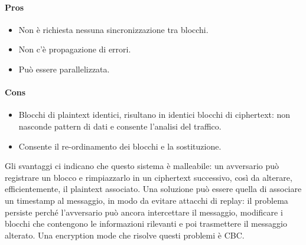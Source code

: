 \documentclass[a4paper,12pt]{article}
\begin{document}
\paragraph{Pros}
\begin{itemize}
	\item Non è richiesta nessuna sincronizzazione tra blocchi.
	\item Non c'è propagazione di errori.
	\item Può essere parallelizzata.
\end{itemize}
\paragraph{Cons}
\begin{itemize}
	\item Blocchi di plaintext identici, risultano in identici blocchi di ciphertext: non nasconde pattern di dati e consente l'analisi del traffico.
	\item Consente il re-ordinamento dei blocchi e la sostituzione.
\end{itemize}
Gli svantaggi ci indicano che questo sistema è malleabile: un avversario può registrare un blocco e rimpiazzarlo in un ciphertext successivo, così da alterare, efficientemente, il plaintext associato.
Una soluzione può essere quella di associare un timestamp al messaggio, in modo da evitare attacchi di replay: il problema persiste perché l'avversario può ancora intercettare il messaggio, modificare i blocchi che contengono le informazioni rilevanti e poi trasmettere il messaggio alterato. Una encryption mode che risolve questi problemi è CBC.
\end{document}
